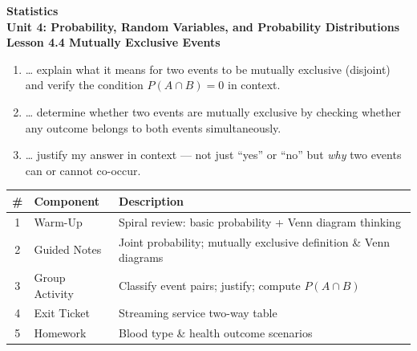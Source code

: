 \documentclass[10pt]{article}
\begin{document}
\vspace{-0.8in}

\begin{center}
  {\color{white}\textbf{\LARGE Statistics}}\\[4pt]
  {\color{skymid}\large\textbf{Unit 4: Probability, Random Variables, and Probability Distributions}}\\[6pt]
  {\color{white}\textbf{\large Lesson 4.4 \quad Mutually Exclusive Events}}
\end{center}

\vspace{0.22in}
\namedateperiod
\vspace{0.18in}

\begin{learningtargetbox}
\small
\begin{enumerate}[leftmargin=1.5em, itemsep=5pt]
  \item \ldots{} explain what it means for two events to be mutually exclusive (disjoint)
        and verify the condition $P(A \cap B) = 0$ in context.
  \item \ldots{} determine whether two events are mutually exclusive by checking whether
        any outcome belongs to both events simultaneously.
  \item \ldots{} justify my answer in context --- not just ``yes'' or ``no'' but
        \emph{why} two events can or cannot co-occur.
\end{enumerate}
\end{learningtargetbox}

\vspace{0.14in}

\begin{tocbox}
\small
\renewcommand{\arraystretch}{1.5}
\begin{tabularx}{\linewidth}{@{} c l X @{}}
\rowcolor{sky}
\textbf{\#} & \textbf{Component} & \textbf{Description} \\
\midrule
1 & Warm-Up        & Spiral review: basic probability + Venn diagram thinking \\
2 & Guided Notes   & Joint probability; mutually exclusive definition \& Venn diagrams \\
3 & Group Activity & Classify event pairs; justify; compute $P(A \cap B)$ \\
4 & Exit Ticket    & Streaming service two-way table \\
5 & Homework       & Blood type \& health outcome scenarios \\
\end{tabularx}
\end{tocbox}
\end{document}
